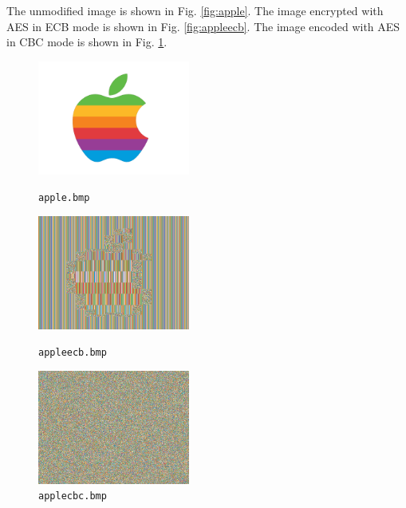 \documentclass[letterpaper]{article}
\begin{document}
\section{}
The unmodified image is shown in Fig. \ref{fig:apple}. The image encrypted with AES in ECB mode is shown in Fig. \ref{fig:appleecb}. The image encoded with AES in CBC mode is shown in Fig. \ref{fig:applecbc}.

\begin{figure}[h!]
    \centering
    \begin{minipage}{5cm}
        \includegraphics[width=5cm]{apple.png}
        \caption{\texttt{apple.bmp}}
        \label{fig:apple}
    \end{minipage}
    \hspace{0.7cm}
    \begin{minipage}{5cm}
        \includegraphics[width=5cm]{appleecb.png}
        \caption{\texttt{appleecb.bmp}}
        \label{fig:appleecb}
    \end{minipage}
    \hspace{0.7cm}
    \begin{minipage}{5cm}
        \includegraphics[width=5cm]{applecbc.png}
        \caption{\texttt{applecbc.bmp}}
        \label{fig:applecbc}
    \end{minipage}
    \hfill
\end{figure}
\end{document}
